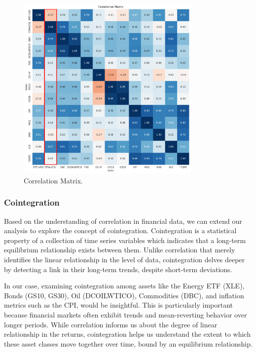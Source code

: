 \documentclass{article}
\begin{document}
\begin{figure}[H]
    \centering
    \includegraphics[width=0.8\textwidth]{figure/Correlation_Matrix.pdf}
    \caption{Correlation Matrix.}
    \label{fig:mesh1}
\end{figure}


\subsubsection*{Cointegration}

Based on the understanding of correlation in financial data, we can extend our analysis to explore the concept of cointegration. Cointegration is a statistical property of a collection of time series variables which indicates that a long-term equilibrium relationship exists between them. Unlike correlation that merely identifies the linear relationship in the level of data, cointegration delves deeper by detecting a link in their long-term trends, despite short-term deviations.

In our case, examining cointegration among assets like the Energy ETF (XLE), Bonds (GS10, GS30), Oil (DCOILWTICO), Commodities (DBC), and inflation metrics such as the CPI, would be insightful. This is particularly important because financial markets often exhibit trends and mean-reverting behavior over longer periods. While correlation informs us about the degree of linear relationship in the returns, cointegration helps us understand the extent to which these asset classes move together over time, bound by an equilibrium relationship.
\end{document}
